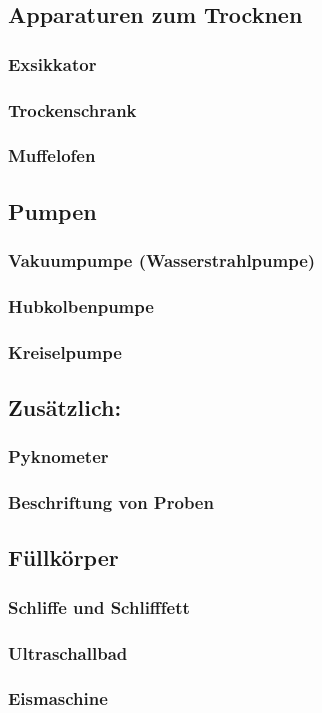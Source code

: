 \subsection{Apparaturen zum Trocknen}
\subsubsection*{Exsikkator}
\subsubsection*{Trockenschrank}
\subsubsection*{Muffelofen}

\subsection{Pumpen}
\subsubsection*{Vakuumpumpe (Wasserstrahlpumpe)}
\subsubsection*{Hubkolbenpumpe}
\subsubsection*{Kreiselpumpe}

\subsection{Zusätzlich:}
\subsubsection{Pyknometer}
\subsubsection*{Beschriftung von Proben}
\subsection*{Füllkörper}
\subsubsection*{Schliffe und Schlifffett}
\label{sec:normschliff}
\subsubsection*{Ultraschallbad}
\subsubsection*{Eismaschine}
